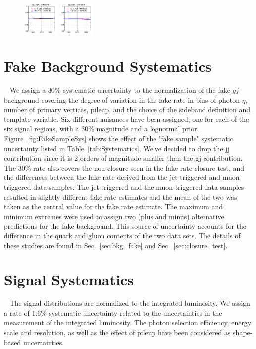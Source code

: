 \begin{figure}[!htbp]
{{\includegraphics[width=0.16\textwidth]{fig/spectra__pdf49_BB18_ADDGRW.png}
\includegraphics[width=0.16\textwidth]{fig/spectra__pdf50_BB18_ADDGRW.png}\\}
\label{Fig:PDFs_Sys2} }
\end{figure}

\section{Fake Background Systematics}~\label{sec:fakeBKGSYS}
\RaggedRight \parindent=25pt
We assign a 30\% systematic uncertainty to the normalization of the fake $gj$ background covering the degree of variation in the fake rate in bins of photon $\eta$, number of primary vertices, pileup, and the choice of the sideband definition and template variable. Six different nuisances have been assigned, one for each of the six signal regions, with a 30\% magnitude and a lognormal prior. Figure~\ref{fig:FakeSampleSys} shows the effect of the "fake sample" systematic uncertainty listed in Table~\ref{tab:Systematics}. We've decided to drop the jj contribution since it is 2 orders of magnitude smaller than the gj contribution. The 30\% rate also covers the non-closure seen in the fake rate closure test, and the differences between the fake rate derived from the jet-triggered and muon-triggered data samples. The jet-triggered and the muon-triggered data samples resulted in slightly different fake rate estimates and the mean of the two was taken as the central value for the fake rate estimate. The maximum and minimum extremes were used to assign two (plus and minus) alternative predictions for the fake background. This source of uncertainty accounts for the difference in the quark and gluon contents of the two data sets. The details of these studies are found in Sec.~\ref{sec:bkg_fake} and Sec.~\ref{sec:closure_test}. 

\section{Signal Systematics}~\label{sec:sigSYS}
The signal distributions are normalized to the integrated luminosity. We assign a rate of 1.6\% systematic uncertainty related to the uncertainties in the measurement of the integrated luminosity. The photon selection efficiency, energy scale and resolution, as well as the effect of pileup have been considered as shape-based uncertainties. 



